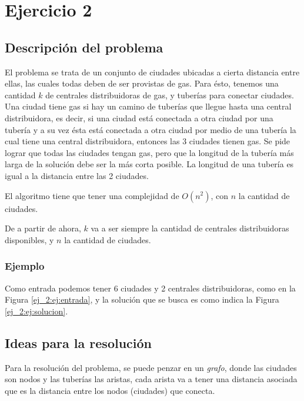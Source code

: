 \section{Ejercicio 2}

\subsection{Descripci\'on del problema} \label{ej_2:descripcion}

El problema se trata de un conjunto de ciudades ubicadas a cierta distancia entre ellas, las cuales todas deben de ser provistas de gas.
Para \'esto, tenemos una cantidad $k$ de centrales distribuidoras de gas, y tuber\'ias para conectar ciudades.
Una ciudad tiene gas si hay un camino de tuber\'ias que llegue hasta una central distribuidora, es decir,
si una ciudad est\'a conectada a otra ciudad por una tuber\'ia y a su vez \'esta est\'a conectada a otra ciudad
por medio de una tuber\'ia la cual tiene una central distribuidora, entonces las 3 ciudades tienen gas.
Se pide lograr que todas las ciudades tengan gas, pero que la longitud de la tuber\'ia m\'as larga de la soluci\'on
debe ser la m\'as corta posible. La longitud de una tuber\'ia es igual a la distancia entre las 2 ciudades.

El algoritmo tiene que tener una complejidad de $O(n^2)$, con $n$ la cantidad de ciudades.

De a partir de ahora, $k$ va a ser siempre la cantidad de centrales distribuidoras disponibles, y $n$ la cantidad de ciudades.

\subsubsection{Ejemplo}

Como entrada podemos tener 6 ciudades y 2 centrales distribuidoras, como en la Figura \ref{ej_2:ej:entrada}, y la soluci\'on que se busca es como indica la Figura \ref{ej_2:ej:solucion}.



\subsection{Ideas para la resoluci\'on} \label{ej_2:idea}

Para la resoluci\'on del problema, se puede penzar en un \emph{grafo}, donde las ciudades son nodos y las tuber\'ias las aristas,
cada arista va a tener una distancia asociada que es la distancia entre los nodos (ciudades) que conecta.

